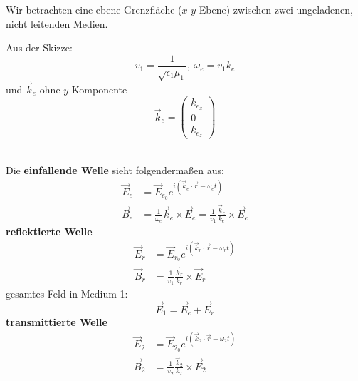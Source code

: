 Wir betrachten eine ebene Grenzfläche ($ x $-$ y $-Ebene) zwischen zwei ungeladenen, nicht leitenden Medien.\\
\begin{minipage}{.55\linewidth}
	Aus der Skizze:
	\begin{equation*}
	v_1 = \frac{1}{\sqrt{\epsilon_1 \mu_1}} , \ \omega_e = v_1 k_e
	\end{equation*}
	und $ \vec{k}_e $ ohne $ y $-Komponente
	\begin{equation*}
	\vec{k}_e = \begin{pmatrix}
	k_{e_x} \\ 0 \\ k_{e_z}
	\end{pmatrix}
	\end{equation*}
\end{minipage}%
\begin{minipage}{.45\linewidth}
	\vspace{5pt}
\end{minipage}%
\\
Die \textbf{einfallende Welle} sieht folgendermaßen aus:
\begin{align*}
\vec{E}_e &= \vec{E}_{e_0} e^{i(\vec{k}_e \cdot \vec{r} - \omega_e t)}\\
\vec{B}_e &= \frac{1}{\omega_e} \vec{k}_e \times \vec{E}_e = \frac{1}{v_1} \frac{\vec{k}_e}{k_e} \times \vec{E}_e
\end{align*}
\textbf{reflektierte Welle}
\begin{align*}
\vec{E}_r &= \vec{E}_{r_0} e^{i(\vec{k}_r \cdot \vec{r} - \omega_r t)} \\
\vec{B}_r &= \frac{1}{v_1} \frac{\vec{k}_r}{k_r} \times \vec{E}_r
\end{align*}
gesamtes Feld in Medium 1:
\begin{equation*}
\vec{E}_1 = \vec{E}_e + \vec{E}_r
\end{equation*}
\textbf{transmittierte Welle}
\begin{align*}
\vec{E}_2 &= \vec{E}_{2_0} e^{i(\vec{k}_2 \cdot \vec{r} - \omega_2 t)} \\
\vec{B}_2 &= \frac{1}{v_2} \frac{\vec{k}_2}{k_2} \times \vec{E}_2
\end{align*}

